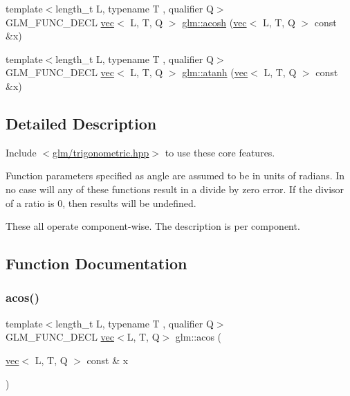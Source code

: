 \begin{DoxyCompactItemize}
\item 
{\footnotesize template$<$length\+\_\+t L, typename T , qualifier Q$>$ }\\G\+L\+M\+\_\+\+F\+U\+N\+C\+\_\+\+D\+E\+CL \hyperlink{structglm_1_1vec}{vec}$<$ L, T, Q $>$ \hyperlink{group__core__func__trigonometric_ga858f35dc66fd2688f20c52b5f25be76a}{glm\+::acosh} (\hyperlink{structglm_1_1vec}{vec}$<$ L, T, Q $>$ const \&x)
\item 
{\footnotesize template$<$length\+\_\+t L, typename T , qualifier Q$>$ }\\G\+L\+M\+\_\+\+F\+U\+N\+C\+\_\+\+D\+E\+CL \hyperlink{structglm_1_1vec}{vec}$<$ L, T, Q $>$ \hyperlink{group__core__func__trigonometric_gabc925650e618357d07da255531658b87}{glm\+::atanh} (\hyperlink{structglm_1_1vec}{vec}$<$ L, T, Q $>$ const \&x)
\end{DoxyCompactItemize}


\subsection{Detailed Description}
Include $<$\hyperlink{trigonometric_8hpp}{glm/trigonometric.\+hpp}$>$ to use these core features.

Function parameters specified as angle are assumed to be in units of radians. In no case will any of these functions result in a divide by zero error. If the divisor of a ratio is 0, then results will be undefined.

These all operate component-\/wise. The description is per component. 

\subsection{Function Documentation}
\mbox{\label{group__core__func__trigonometric_gacc9b092df8257c68f19c9053703e2563}} 
\subsubsection{\texorpdfstring{acos()}{acos()}}
{\footnotesize\ttfamily template$<$length\+\_\+t L, typename T , qualifier Q$>$ \\
G\+L\+M\+\_\+\+F\+U\+N\+C\+\_\+\+D\+E\+CL \hyperlink{structglm_1_1vec}{vec}$<$L, T, Q$>$ glm\+::acos (\begin{DoxyParamCaption}\item[{\hyperlink{structglm_1_1vec}{vec}$<$ L, T, Q $>$ const \&}]{x }\end{DoxyParamCaption})}



